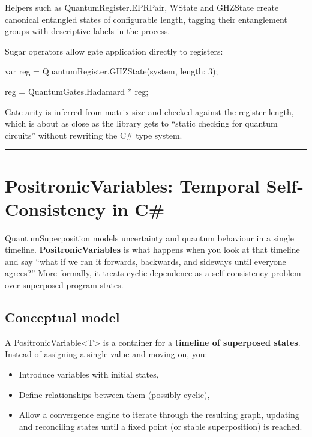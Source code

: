 \documentclass[a4paper,11pt]{article}
\begin{document}
Helpers such as QuantumRegister.EPRPair, WState and GHZState create canonical entangled states of configurable length, tagging their entanglement groups with descriptive labels in the process.

Sugar operators allow gate application directly to registers:

var reg = QuantumRegister.GHZState(system, length: 3);

reg = QuantumGates.Hadamard * reg;

Gate arity is inferred from matrix size and checked against the register length, which is about as close as the library gets to ``static checking for quantum circuits'' without rewriting the C\# type system.

\begin{center}\rule{0.5\linewidth}{0.5pt}\end{center}

\section[PositronicVariables: Temporal Self-Consistency in C Sharp]{PositronicVariables: Temporal Self-Consistency in C\#}

QuantumSuperposition models uncertainty and quantum behaviour in a single timeline.
\textbf{PositronicVariables} is what happens when you look at that timeline and say
``what if we ran it forwards, backwards, and sideways until everyone agrees?''
More formally, it treats cyclic dependence as a self-consistency problem over
superposed program states.

\subsection{Conceptual model}

A PositronicVariable\textless T\textgreater{} is a container for a \textbf{timeline of superposed states}. Instead of assigning a single value and moving on, you:

\begin{itemize}
\item
  Introduce variables with initial states,
\item
  Define relationships between them (possibly cyclic),
\item
  Allow a convergence engine to iterate through the resulting graph, updating and reconciling states until a fixed point (or stable superposition) is reached.
\end{itemize}
\end{document}
